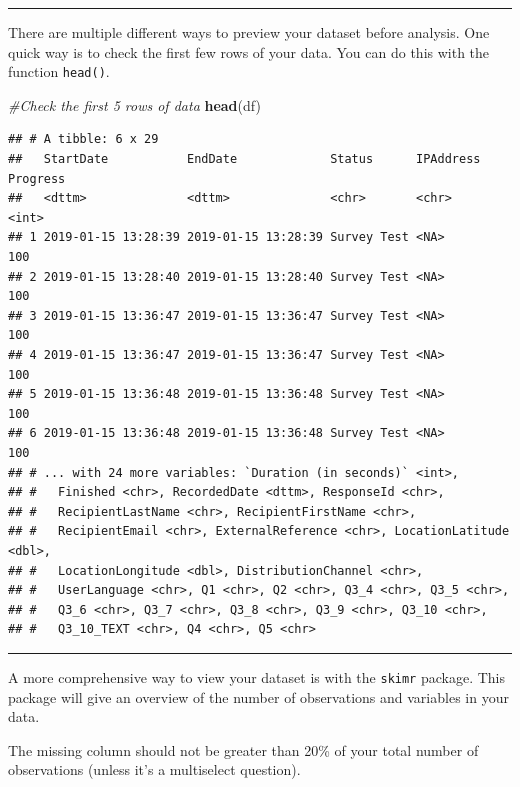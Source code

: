 \documentclass[]{book}
\newenvironment{Shaded}{\begin{snugshade}}{\end{snugshade}}
\newcommand{\KeywordTok}[1]{\textcolor[rgb]{0.13,0.29,0.53}{\textbf{#1}}}
\newcommand{\CommentTok}[1]{\textcolor[rgb]{0.56,0.35,0.01}{\textit{#1}}}
\newcommand{\NormalTok}[1]{#1}
\begin{document}
\begin{center}\rule{0.5\linewidth}{\linethickness}\end{center}

There are multiple different ways to preview your dataset before
analysis. One quick way is to check the first few rows of your data. You
can do this with the function \texttt{head()}.

\begin{Shaded}
\begin{Highlighting}[]
\CommentTok{#Check the first 5 rows of data}
\KeywordTok{head}\NormalTok{(df)}
\end{Highlighting}
\end{Shaded}

\begin{verbatim}
## # A tibble: 6 x 29
##   StartDate           EndDate             Status      IPAddress Progress
##   <dttm>              <dttm>              <chr>       <chr>        <int>
## 1 2019-01-15 13:28:39 2019-01-15 13:28:39 Survey Test <NA>           100
## 2 2019-01-15 13:28:40 2019-01-15 13:28:40 Survey Test <NA>           100
## 3 2019-01-15 13:36:47 2019-01-15 13:36:47 Survey Test <NA>           100
## 4 2019-01-15 13:36:47 2019-01-15 13:36:47 Survey Test <NA>           100
## 5 2019-01-15 13:36:48 2019-01-15 13:36:48 Survey Test <NA>           100
## 6 2019-01-15 13:36:48 2019-01-15 13:36:48 Survey Test <NA>           100
## # ... with 24 more variables: `Duration (in seconds)` <int>,
## #   Finished <chr>, RecordedDate <dttm>, ResponseId <chr>,
## #   RecipientLastName <chr>, RecipientFirstName <chr>,
## #   RecipientEmail <chr>, ExternalReference <chr>, LocationLatitude <dbl>,
## #   LocationLongitude <dbl>, DistributionChannel <chr>,
## #   UserLanguage <chr>, Q1 <chr>, Q2 <chr>, Q3_4 <chr>, Q3_5 <chr>,
## #   Q3_6 <chr>, Q3_7 <chr>, Q3_8 <chr>, Q3_9 <chr>, Q3_10 <chr>,
## #   Q3_10_TEXT <chr>, Q4 <chr>, Q5 <chr>
\end{verbatim}

\begin{center}\rule{0.5\linewidth}{\linethickness}\end{center}

A more comprehensive way to view your dataset is with the \texttt{skimr}
package. This package will give an overview of the number of
observations and variables in your data.

The missing column should not be greater than 20\% of your total number
of observations (unless it's a multiselect question).
\end{document}
